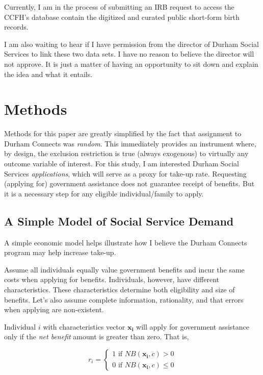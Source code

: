 \documentclass[12pt,letterpaperpaper,]{book}
\begin{document}
Currently, I am in the process of submitting an IRB request to access
the CCFH's database contain the digitized and curated public short-form
birth records.

I am also waiting to hear if I have permission from the director of
Durham Social Services to link these two data sets. I have no reason to
believe the director will not approve. It is just a matter of having an
opportunity to sit down and explain the idea and what it entails.

\section*{Methods}\label{methods-2}

Methods for this paper are greatly simplified by the fact that
assignment to Durham Connects was \emph{random}. This immediately
provides an instrument where, by design, the exclusion restriction is
true (always exogenous) to virtually any outcome variable of interest.
For this study, I am interested Durham Social Services
\emph{applications}, which will serve as a proxy for take-up rate.
Requesting (applying for) government assistance does not guarantee
receipt of benefits. But it is a necessary step for any eligible
individual/family to apply.

\subsection*{A Simple Model of Social Service
Demand}\label{a-simple-model-of-social-service-demand}

A simple economic model helps illustrate how I believe the Durham
Connects program may help increase take-up.

Assume all individuals equally value government benefits and incur the
same costs when applying for benefits. Individuals, however, have
different characteristics. These characteristics determine both
eligibility and size of benefits. Let's also assume complete
information, rationality, and that errors when applying are
non-existent.

Individual \(i\) with characteristics vector \(\bm{x_i}\) will apply for
government assistance only if the \emph{net benefit} amount is greater
than zero. That is,

\[
r_i  = \left \{ 
  \begin{array}{c} 
    1 \text{ if } NB(\bm{x_i}, c) > 0 \\ 
    0 \text{ if } NB(\bm{x_i}, c) \le 0 
  \end{array} \right.
\]
\end{document}
